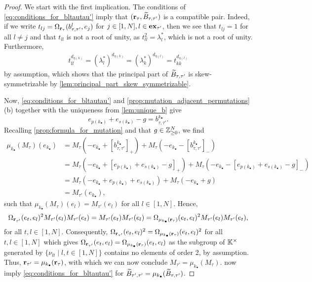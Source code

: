 \begin{proof}

	We start with the first implication. The conditions of
	\cref{eq:conditions_for_bltautau'} imply that $(\mathbf{r}_\tau, \widetilde{B}_{\tau, {\tau'}})$ is a
	compatible pair. Indeed, if we write $t_{lj} = \Omega_{\mathbf{r}_\tau}(b^l_{\tau, {\tau'}},
		e_j)$ for $j\in[1, N], l \in \mathbf{ex}_{\tau'}$, then we see that $t_{lj} = 1$ for all $l
		\neq j$ and that $t_{ll}$ is not a root of unity, as $t_{ll}^2 = \lambda_l^*$, which is
	not a root of unity. Furthermore,
	\begin{align*}
		t_{ll}^{d_{\eta(k)}}  = (\lambda^*_l)^{d_{\eta(k)}} = (\lambda^*_k)^{d_{\eta(l)}} = t_{kk}^{d_{\eta(l)}}
	\end{align*}
	by assumption, which shows that the principal part of $\widetilde{B}_{\tau, {\tau'}}$ is
	skew-symmetrizable by \cref{lem:principal_part_skew_symmetrizable}.

	Now, \cref{eq:conditions_for_bltautau'} and \cref{prop:mutation_adjacent_permutations}
	(b) together with the uniqueness from \cref{lem:unique_b} give
	\begin{equation*}
		e_{p(k_\bullet)} + e_{s(k_\bullet)} - g = b^{k_\bullet}_{\tau, \tau'}.
	\end{equation*}
	Recalling \cref{prop:formula_for_mutation} and that $g \in \mathbb{Z}_{\geq 0}^N$, we find
	\begin{align*}
		\mu_{k_\bullet}(M_\tau)(e_{k_\bullet})
		 & = M_\tau(-e_{k_\bullet} + [b^{k_\bullet}_{\tau, \tau'}]_{+}) + M_\tau(-e_{k_\bullet} - [b^{k_\bullet}_{\tau, \tau'}]_{-})                         \\
		 & = M_\tau(-e_{k_\bullet} + [e_{p(k_\bullet)} + e_{s(k_\bullet)} - g]_{+}) + M_\tau(-e_{k_\bullet} - [e_{p(k_\bullet)} + e_{s(k_\bullet)} - g]_{-}) \\
		 & = M_\tau(-e_{k_\bullet} + e_{p(k_\bullet)} + e_{s(k_\bullet)}) + M_\tau(-e_{k_\bullet} + g)                                                       \\
		 & = M_{\tau'}(e_{k_\bullet}),
	\end{align*}
	such that $\mu_{k_\bullet}(M_\tau)(e_l) = M_{\tau'}(e_l)$ for all $l \in [1, N]$. Hence,
	\begin{equation*}
		\Omega_{\mathbf{r}_{\tau'}}(e_t, e_l)^2 M_{\tau'}(e_l)M_{\tau'}(e_t) = M_{\tau'}(e_t)M_{\tau'}(e_l) = \Omega_{\mu_{k_\bullet}(\mathbf{r}_{\tau})}(e_t, e_l)^2 M_{\tau'}(e_l)M_{\tau'}(e_t),
	\end{equation*}
	for all $t, l \in [1, N]$. Consequently, $\Omega_{\mathbf{r}_{\tau'}}(e_t, e_l)^2 =
		\Omega_{\mu_{k_\bullet}(\mathbf{r}_\tau)}(e_t, e_l)^2$ for all $t, l \in [1, N]$ which gives
	$\Omega_{\mathbf{r}_{\tau'}}(e_t, e_l) = \Omega_{\mu_{k_\bullet}(\mathbf{r}_\tau)}(e_t, e_l)$ as
	the subgroup of $\mathbb{K}^\times$ generated by $\{\nu_{lt} \mid l,t \in [1, N]\}$ contains
	no elements of order 2, by assumption. Thus, $\mathbf{r}_{\tau'} =
		\mu_{k_\bullet}(\mathbf{r}_{\tau})$, with which we can now conclude $M_{\tau'} =
		\mu_{k_\bullet}(M_\tau)$.
	 now imply
	\cref{eq:conditions_for_bltautau'} for $\widetilde{B}_{\tau', \tau'} = \mu_{k_\bullet}(\widetilde{B}_{\tau,
			\tau'})$.


\end{proof}
